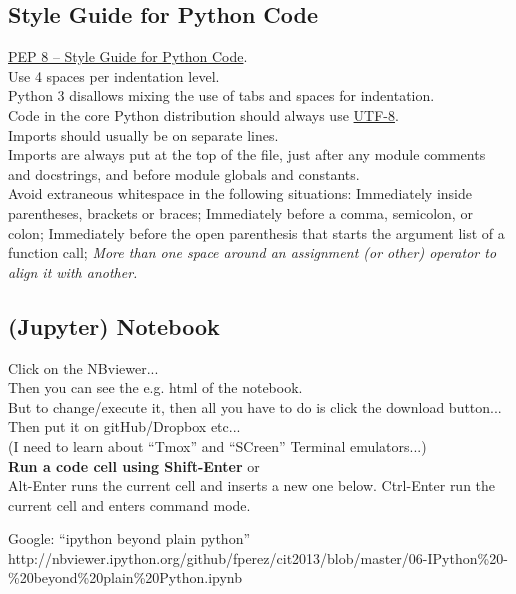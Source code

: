 \documentclass[11pt,a4paper]{article}
\begin{document}
    \subsection{Style Guide for Python Code}
    \href{https://www.python.org/dev/peps/pep-0008/}{PEP 8 -- Style Guide for Python Code}.\\
    Use 4 spaces per indentation level.\\
    Python 3 disallows mixing the use of tabs and spaces for indentation.\\
    Code in the core Python distribution should always use \href{https://en.wikipedia.org/wiki/UTF-8}{UTF-8}. \\
    Imports should usually be on separate lines. \\
    Imports are always put at the top of the file, just after any module comments and docstrings, and before module globals and constants.\\
    Avoid extraneous whitespace in the following situations: Immediately inside parentheses, brackets or braces; Immediately before a comma, semicolon, or colon; Immediately before the open parenthesis that starts the argument list of a function call; {\it More than one space around an assignment (or other) operator to align it with another.}\\



    \subsection{(Jupyter) Notebook}
    Click on the NBviewer...\\
    Then you can see the e.g. html of the notebook. \\
    But to change/execute it, then all you have to do is click the download button...\\
    Then put it on gitHub/Dropbox etc...\\
    (I need to learn about ``Tmox'' and ``SCreen'' Terminal emulators...)\\
  
    \noindent
    {\bf Run a code cell using Shift-Enter} or \\
    Alt-Enter runs the current cell and inserts a new one below.
    Ctrl-Enter run the current cell and enters command mode. 

    \noindent
    Google: ``ipython beyond plain python''\\
    
    http://nbviewer.ipython.org/github/fperez/cit2013/blob/master/06-IPython\%20-\%20beyond\%20plain\%20Python.ipynb
\end{document}
